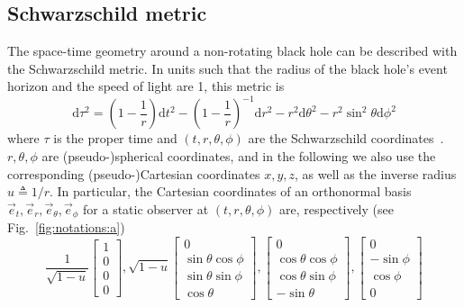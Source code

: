 \documentclass{document}
\newcommand{\diff}{\mathrm d}
\begin{document}
\subsection{Schwarzschild metric}

The space-time geometry around a non-rotating black hole can be described with 
the Schwarzschild metric. In units such that the radius of the black hole's 
event horizon and the speed of light are 1, this metric is
\begin{equation}
\diff\tau^2 = \left(1 - \frac{1}{r}\right) \diff t^2 -
              \left(1 - \frac{1}{r}\right)^{-1} \diff r^2 -
              r^2 \diff \theta^2 - 
              r^2 \sin^2\theta \diff \phi^2
\label{eq:metric}
\end{equation}
where $\tau$ is the proper time and $(t, r, \theta, \phi)$ are the 
Schwarzschild coordinates~\cite{weinberg1972}. $r, \theta, \phi$ are 
(pseudo-)spherical coordinates, and in the following we also use the 
corresponding (pseudo-)Cartesian coordinates $x,y,z$, as well as the inverse 
radius $u\triangleq 1/r$. In particular, the Cartesian coordinates of an 
orthonormal basis $\vec{e}_t, \vec{e}_r, \vec{e}_\theta, \vec{e}_\phi$ for 
a static observer at $(t, r, \theta, \phi)$ are, respectively (see 
Fig.~\ref{fig:notations:a})
\begin{equation}
\frac{1}{\sqrt{1-u}}
\begin{bmatrix}
  1\\
  0\\
  0\\
  0
\end{bmatrix},
%
\sqrt{1-u}
\begin{bmatrix}
  0\\
  \sin\theta \cos\phi\\
  \sin\theta \sin\phi\\
  \cos\theta
\end{bmatrix},
%
\begin{bmatrix}
  0\\
  \cos\theta \cos\phi\\
  \cos\theta \sin\phi\\
  -\sin\theta
\end{bmatrix},
%
\begin{bmatrix}
  0\\
  -\sin\phi\\
  \cos\phi\\
  0
\end{bmatrix}
\label{eq:staticbasis}
\end{equation}
\end{document}
